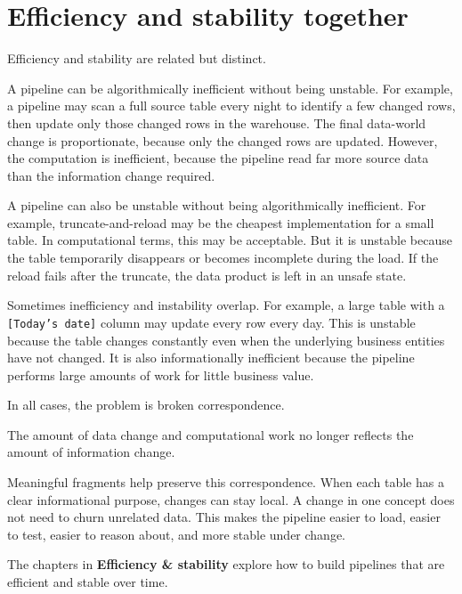 \documentclass[10pt,openany,10pt]{book}
\begin{document}
\section{Efficiency and stability
together}\label{efficiency-and-stability-together}

Efficiency and stability are related but distinct.

A pipeline can be algorithmically inefficient without being unstable.
For example, a pipeline may scan a full source table every night to
identify a few changed rows, then update only those changed rows in the
warehouse. The final data-world change is proportionate, because only
the changed rows are updated. However, the computation is inefficient,
because the pipeline read far more source data than the information
change required.

A pipeline can also be unstable without being algorithmically
inefficient. For example, truncate-and-reload may be the cheapest
implementation for a small table. In computational terms, this may be
acceptable. But it is unstable because the table temporarily disappears
or becomes incomplete during the load. If the reload fails after the
truncate, the data product is left in an unsafe state.

Sometimes inefficiency and instability overlap. For example, a large
table with a \texttt{{[}Today’s\ date{]}} column may update every row
every day. This is unstable because the table changes constantly even
when the underlying business entities have not changed. It is also
informationally inefficient because the pipeline performs large amounts
of work for little business value.

In all cases, the problem is broken correspondence.

The amount of data change and computational work no longer reflects the
amount of information change.

Meaningful fragments help preserve this correspondence. When each table
has a clear informational purpose, changes can stay local. A change in
one concept does not need to churn unrelated data. This makes the
pipeline easier to load, easier to test, easier to reason about, and
more stable under change.

The chapters in \textbf{Efficiency \& stability} explore how to build
pipelines that are efficient and stable over time.
\end{document}

